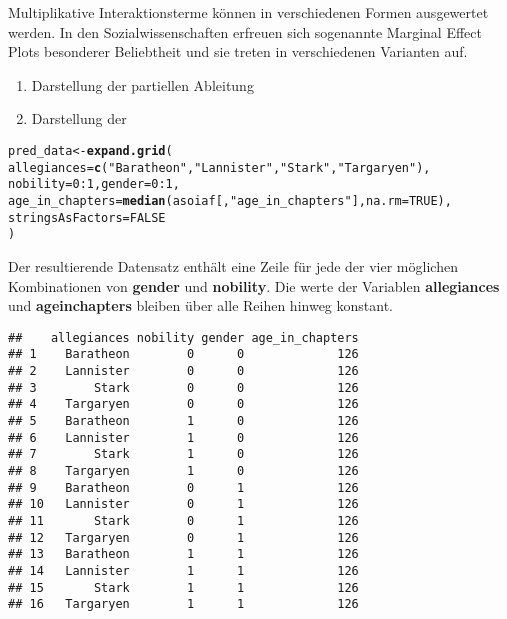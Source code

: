 \documentclass{article}\usepackage[]{graphicx}\usepackage[]{color}
\makeatletter
\newcommand{\hlnum}[1]{\textcolor[rgb]{0.686,0.059,0.569}{#1}}%
\newcommand{\hlstr}[1]{\textcolor[rgb]{0.192,0.494,0.8}{#1}}%
\newcommand{\hlopt}[1]{\textcolor[rgb]{0,0,0}{#1}}%
\newcommand{\hlstd}[1]{\textcolor[rgb]{0.345,0.345,0.345}{#1}}%
\newcommand{\hlkwb}[1]{\textcolor[rgb]{0.69,0.353,0.396}{#1}}%
\newcommand{\hlkwc}[1]{\textcolor[rgb]{0.333,0.667,0.333}{#1}}%
\newcommand{\hlkwd}[1]{\textcolor[rgb]{0.737,0.353,0.396}{\textbf{#1}}}%
\newenvironment{kframe}{%
 \def\at@end@of@kframe{}%
 \ifinner\ifhmode%
  \def\at@end@of@kframe{\end{minipage}}%
  \begin{minipage}{\columnwidth}%
 \fi\fi%
 \def\FrameCommand##1{\hskip\@totalleftmargin \hskip-\fboxsep
 \colorbox{shadecolor}{##1}\hskip-\fboxsep
     \hskip-\linewidth \hskip-\@totalleftmargin \hskip\columnwidth}%
 \MakeFramed {\advance\hsize-\width
   \@totalleftmargin\z@ \linewidth\hsize
   \@setminipage}}%
 {\par\unskip\endMakeFramed%
 \at@end@of@kframe}
\newenvironment{knitrout}{}{} %
\makeatother
\begin{document}
Multiplikative Interaktionsterme können in verschiedenen
Formen ausgewertet werden. In den Sozialwissenschaften
erfreuen sich sogenannte Marginal Effect Plots besonderer
Beliebtheit und sie treten in verschiedenen Varianten auf.

\begin{enumerate}
  \item Darstellung der partiellen Ableitung
  \item Darstellung der
\end{enumerate}


\begin{knitrout}
\color{fgcolor}\begin{kframe}
\begin{alltt}
\hlstd{pred_data} \hlkwb{<-} \hlkwd{expand.grid}\hlstd{(}
  \hlkwc{allegiances} \hlstd{=} \hlkwd{c}\hlstd{(}\hlstr{"Baratheon"}\hlstd{,}  \hlstr{"Lannister"}\hlstd{,} \hlstr{"Stark"}\hlstd{,} \hlstr{"Targaryen"}\hlstd{),}
  \hlkwc{nobility} \hlstd{=} \hlnum{0}\hlopt{:}\hlnum{1}\hlstd{,} \hlkwc{gender} \hlstd{=} \hlnum{0}\hlopt{:}\hlnum{1}\hlstd{,}
  \hlkwc{age_in_chapters} \hlstd{=} \hlkwd{median}\hlstd{(asoiaf[,} \hlstr{"age_in_chapters"}\hlstd{],} \hlkwc{na.rm} \hlstd{=} \hlnum{TRUE}\hlstd{),}
  \hlkwc{stringsAsFactors} \hlstd{=} \hlnum{FALSE}
\hlstd{)}
\end{alltt}
\end{kframe}
\end{knitrout}

Der resultierende Datensatz enthält eine Zeile für jede der
vier möglichen Kombinationen von \textbf{gender} und
\textbf{nobility}. Die werte der Variablen \textbf{allegiances}
und \textbf{age{\textunderscore}in{\textunderscore}chapters}
bleiben über alle Reihen hinweg konstant.

\begin{knitrout}
\color{fgcolor}\begin{kframe}
\begin{verbatim}
##    allegiances nobility gender age_in_chapters
## 1    Baratheon        0      0             126
## 2    Lannister        0      0             126
## 3        Stark        0      0             126
## 4    Targaryen        0      0             126
## 5    Baratheon        1      0             126
## 6    Lannister        1      0             126
## 7        Stark        1      0             126
## 8    Targaryen        1      0             126
## 9    Baratheon        0      1             126
## 10   Lannister        0      1             126
## 11       Stark        0      1             126
## 12   Targaryen        0      1             126
## 13   Baratheon        1      1             126
## 14   Lannister        1      1             126
## 15       Stark        1      1             126
## 16   Targaryen        1      1             126
\end{verbatim}
\end{kframe}
\end{knitrout}
\end{document}
